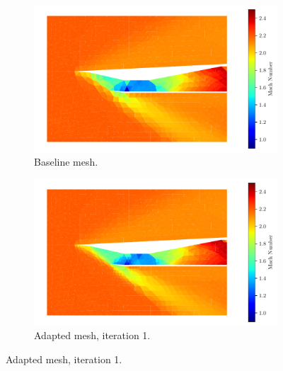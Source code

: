 \pagebreak
\begin{figure}[h!]\ContinuedFloat
    \centering
    \begin{subfigure}[h]{0.49\linewidth}
        \centering
        \includegraphics[width=\linewidth]{rep/q4/Machfield0.pdf}
        \caption{Baseline mesh.}
    \end{subfigure}
    \begin{subfigure}[h]{0.49\linewidth}
        \centering
        \includegraphics[width=\linewidth]{rep/q4/Machfield1.pdf}
        \caption{Adapted mesh, iteration 1.}
    \end{subfigure}


\end{figure}
